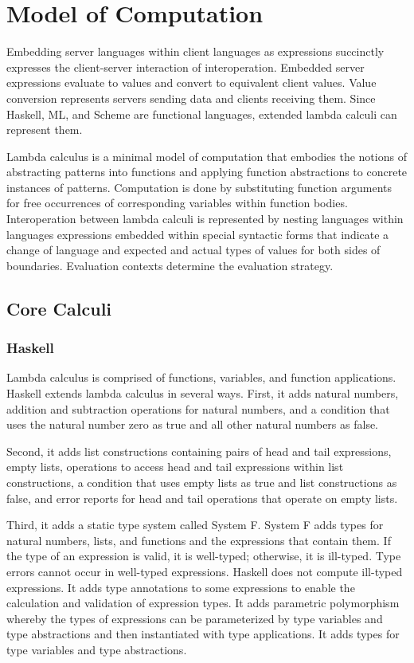 \chapter{Model of Computation}

Embedding server languages within client languages as expressions succinctly expresses the client-server interaction of interoperation.  Embedded server expressions evaluate to values and convert to equivalent client values.  Value conversion represents servers sending data and clients receiving them.  Since Haskell, ML, and Scheme are functional languages, extended lambda calculi can represent them.

Lambda calculus is a minimal model of computation that embodies the notions of abstracting patterns into functions and applying function abstractions to concrete instances of patterns.  Computation is done by substituting function arguments for free occurrences of corresponding variables within function bodies.  Interoperation between lambda calculi is represented by nesting languages within languages expressions embedded within special syntactic forms that indicate a change of language and expected and actual types of values for both sides of boundaries.  Evaluation contexts determine the evaluation strategy.

\section{Core Calculi}

\subsection{Haskell}

Lambda calculus is comprised of functions, variables, and function applications.  Haskell extends lambda calculus in several ways.  First, it adds natural numbers, addition and subtraction operations for natural numbers, and a condition that uses the natural number zero as true and all other natural numbers as false.

Second, it adds list constructions containing pairs of head and tail expressions, empty lists, operations to access head and tail expressions within list constructions, a condition that uses empty lists as true and list constructions as false, and error reports for head and tail operations that operate on empty lists.

Third, it adds a static type system called System F.  System F adds types for natural numbers, lists, and functions and the expressions that contain them.  If the type of an expression is valid, it is well-typed; otherwise, it is ill-typed.  Type errors cannot occur in well-typed expressions.  Haskell does not compute ill-typed expressions.  It adds type annotations to some expressions to enable the calculation and validation of expression types.  It adds parametric polymorphism whereby the types of expressions can be parameterized by type variables and type abstractions and then instantiated with type applications.  It adds types for type variables and type abstractions.

